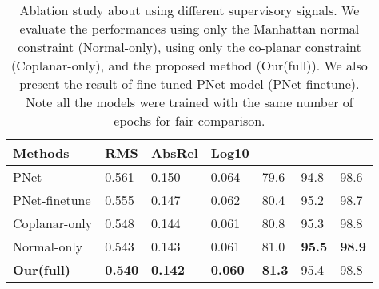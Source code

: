 \documentclass[10pt,twocolumn,letterpaper]{article}
\begin{document}
\begin{table}[ht]
	\scriptsize
	\centering
	\begin{tabularx}{0.48\textwidth}{|l|XXX|XXX|}
		\hline                                                    
		Methods &  RMS & AbsRel & Log10 &  &  &  \\
		\hline
		PNet\cite{yu2020p} & 0.561 & 0.150 & 0.064 & 79.6  & 94.8  & 98.6 \\
		\hline
		\hline
		PNet-finetune & 0.555 & 0.147 & 0.062 & 80.4  & 95.2  & 98.7 \\
		
Coplanar-only & 0.548 & 0.144  & 0.061 & 80.8  & 95.3  & 98.8 \\
		
Normal-only & 0.543 & 0.143 & 0.061 & 81.0 & \textbf{95.5}  & \textbf{98.9} \\
		
\textbf{Our(full)} & \textbf{0.540} & \textbf{0.142} & 
		\textbf{0.060} & \textbf{81.3}  & 95.4  & 98.8 \\
		\hline
	\end{tabularx}\newline
	\caption{Ablation study about using different supervisory signals. 
We evaluate the performances using only the Manhattan normal constraint (Normal-only), using only the co-planar constraint (Coplanar-only), and the proposed method (Our(full)). We also present the result of fine-tuned PNet model (PNet-finetune). Note all the models were trained with the same number of epochs for fair comparison. }
	\label{tab:ablation}\end{table}
\end{document}
